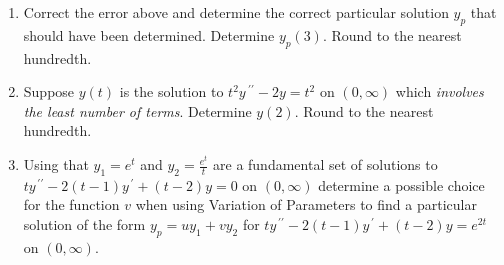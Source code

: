 \documentclass{ximera}
\begin{document}
\begin{enumerate}[label=(\arabic*)]
\begin{enumerate}[label=(\alph*)]
\item The function $\frac{2}{3}x^3-x^2$ is not an antiderivative of $2x^2-2x$.

\item $(-2(x-2)e^x)x+\left(\frac{2}{3}x^3-x^2\right)e^x \neq \left(\frac{2}{3}x^3-3x^2+4x\right)e^x$.

\end{enumerate}


\item Correct the error above and determine the correct particular solution $y_p$ that should have been determined.  Determine $y_p(3)$.  Round to the nearest hundredth.


\newpage


\item Suppose $y(t)$ is the solution to $t^2 y\,^{\prime\prime}-2y=t^2$ on $(0,\infty)$ which \emph{involves the least number of terms}.   Determine $y(2)$.   Round to the nearest hundredth.











\item Using that $y_1=e^{t}$ and $\displaystyle y_2=\frac{e^t}{t}$ are a fundamental set of solutions to \\$ty^{\,\prime\prime}-2(t-1)y^{\,\prime}+(t-2)y=0$ on $(0,\infty)$ determine a possible choice for the function $v$ when using Variation of Parameters to find a particular solution of the form $y_p=uy_1+vy_2$ for $ty^{\,\prime\prime}-2(t-1)y^{\,\prime}+(t-2)y=e^{2t}$ on $(0,\infty)$.






\end{enumerate}
\end{document}

